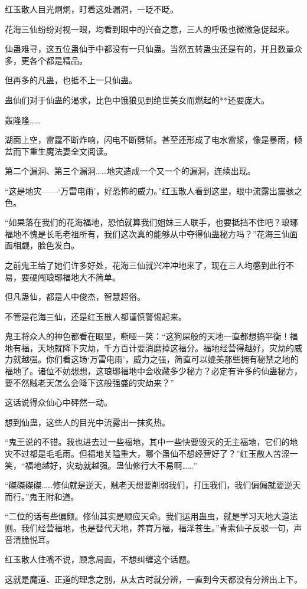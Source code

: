 \begin{this_body}
红玉散人目光炯炯，盯着这处漏洞，一眨不眨。

花海三仙纷纷对视一眼，均看到眼中的兴奋之意，三人的呼吸也微微急促起来。

仙蛊难寻，这五位蛊仙手中都没有一只仙蛊。当然五转蛊虫还是有的，并且数量众多，更各个都是精品。

但再多的凡蛊，也抵不上一只仙蛊。

蛊仙们对于仙蛊的渴求，比色中饿狼见到绝世美女而燃起的**还要庞大。

轰隆隆……

湖面上空，雷霆不断炸响，闪电不断劈斩。甚至还形成了电水雷浆，像是暴雨，倾盆而下重生魔法妻全文阅读。

第二个漏洞、第三个漏洞……地灾造成一个又一个的漏洞，连续出现。

“这是地灾——‘万雷电雨’，好恐怖的威力。”红玉散人看到这里，眼中流露出震骇之色。

“如果落在我们的花海福地，恐怕就算我们姐妹三人联手，也要抵挡不住吧？琅琊福地不愧是长毛老祖所有，我们这次真的能够从中夺得仙蛊秘方吗？”花海三仙面面相觑，脸色发白。

之前鬼王给了她们许多好处，花海三仙就兴冲冲地来了，现在三人均感到此行不易，要硬闯琅琊福地大不简单。

但凡蛊仙，都是人中俊杰，智慧超俗。

不管是花海三仙，还是红玉散人都谨慎警惕起来。

鬼王将众人的神色都看在眼里，嘶哑一笑：“这狗屎般的天地一直都想搞平衡！福地有福，天地就降下灾劫，千方百计要消磨掉这福分。福地经营得越好，灾劫的威力就越强。你们看这场‘万雷电雨’，威力之强，简直可以媲美那些拥有秘禁之地的福地了。诸位不妨想想，这琅琊福地中会收藏多少秘方？必定有许多的仙蛊秘方，要不然贼老天怎么会降下这般强盛的灾劫来？”

这话说得众仙心中砰然一动。

想到仙蛊，这些人的目光中流露出一抹炙热。

“鬼王说的不错。我也进去过一些福地，其中一些快要毁灭的无主福地，它们的地灾不过都是毛毛雨。但福地关隘重大，哪个蛊仙不想经营好了？”红玉散人苦涩一笑，“福地越好，灾劫就越强。蛊仙修行大不易啊……”

“磔磔磔磔……修仙就是逆天，贼老天想要削弱我们，打压我们，我们偏偏就要逆天而行。”鬼王附和道。

“二位的话有些偏颇。修仙其实是顺应天命。我们运用蛊虫，就是学习天地大道法则。我们经营福地，也是替代天地，养育万福，福泽苍生。”青索仙子反驳一句，声音清脆悦耳。

红玉散人住嘴不说，顾念局面，不想纠缠这个话题。

这就是魔道、正道的理念之别，从太古时就分辨，一直到今天都没有分辨出上下。


\end{this_body}
